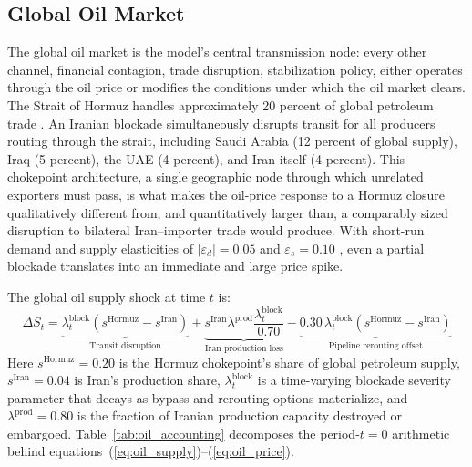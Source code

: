 \documentclass[12pt]{article}
\begin{document}
\subsection{Global Oil Market}

The global oil market is the model's central transmission node: every other channel, financial contagion, trade disruption, stabilization policy, either operates through the oil price or modifies the conditions under which the oil market clears. The Strait of Hormuz handles approximately 20 percent of global petroleum trade \citep{eia2023hormuz}. An Iranian blockade simultaneously disrupts transit for all producers routing through the strait, including Saudi Arabia (12 percent of global supply), Iraq (5 percent), the UAE (4 percent), and Iran itself (4 percent). This chokepoint architecture, a single geographic node through which unrelated exporters must pass, is what makes the oil-price response to a Hormuz closure qualitatively different from, and quantitatively larger than, a comparably sized disruption to bilateral Iran--importer trade would produce. With short-run demand and supply elasticities of $|\varepsilon_d| = 0.05$ and $\varepsilon_s = 0.10$ \citep{hamilton2009understanding}, even a partial blockade translates into an immediate and large price spike.

The global oil supply shock at time $t$ is:
\begin{equation}
\Delta S_t = \underbrace{\lambda^{\text{block}}_t (s^{\text{Hormuz}} - s^{\text{Iran}})}_{\text{Transit disruption}} + \underbrace{s^{\text{Iran}}\lambda^{\text{prod}}\frac{\lambda^{\text{block}}_t}{0.70}}_{\text{Iran production loss}} - \underbrace{0.30\,\lambda^{\text{block}}_t (s^{\text{Hormuz}} - s^{\text{Iran}})}_{\text{Pipeline rerouting offset}}
\label{eq:oil_supply}
\end{equation}
Here $s^{\text{Hormuz}} = 0.20$ is the Hormuz chokepoint's share of global petroleum supply, $s^{\text{Iran}} = 0.04$ is Iran's production share, $\lambda^{\text{block}}_t$ is a time-varying blockade severity parameter that decays as bypass and rerouting options materialize, and $\lambda^{\text{prod}} = 0.80$ is the fraction of Iranian production capacity destroyed or embargoed. Table~\ref{tab:oil_accounting} decomposes the period-$t=0$ arithmetic behind equations~(\ref{eq:oil_supply})--(\ref{eq:oil_price}).
\end{document}
